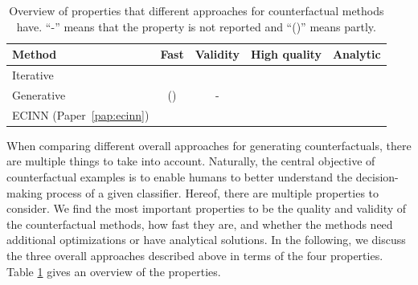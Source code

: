 \documentclass[11pt,a4paper,twoside,openright,final]{memoir}
\newcommand{\cmark}{\ding{51}}%
\newcommand{\xmark}{\ding{55}}%
\newcommand{\greencheck}{\textcolor{green}{\cmark}}
\newcommand{\redcross}{\textcolor{red}{\xmark}}
\newcommand*{\paperref}[1]{Paper~\hyperref[#1]{\ref{#1}}}
\begin{document}
\begin{table}[b]
    \centering
    \begin{tabular}{lcccc}
    \toprule
        \textbf{Method}                                                 & \textbf{Fast}    & \textbf{Validity} & \textbf{High quality}   & \textbf{Analytic}         \\
    \midrule                                                              
        Iterative \cite{Wachter2017, Dhurandhar2018, VanLooveren2019}   & \redcross        & \redcross         &  \redcross             & \redcross                 \\
        Generative \cite{Joshi2018, Rodriguez2021, Singla2019, flowcounterfactuals}  & (\greencheck)      & -                 &  \greencheck           & \redcross                 \\
        ECINN (\paperref{pap:ecinn})                                    & \greencheck      & \greencheck       &  \greencheck           & \greencheck               \\
    \bottomrule
    \end{tabular}
    \caption{Overview of properties that different approaches for counterfactual methods have. ``-'' means that the property is not reported and ``(\greencheck)'' means partly.}
    \label{tab:cf-method-comparison}
\end{table}

When comparing different overall approaches for generating counterfactuals, there are multiple things to take into account.
Naturally, the central objective of counterfactual examples is to enable humans to better understand the decision-making process of a given classifier.
Hereof, there are multiple properties to consider.
We find the most important properties to be the quality and validity of the counterfactual methods, how fast they are, and whether the methods need additional optimizations or have analytical solutions.
In the following, we discuss the three overall approaches described above in terms of the four properties.
Table \ref{tab:cf-method-comparison} gives an overview of the properties.
\end{document}
